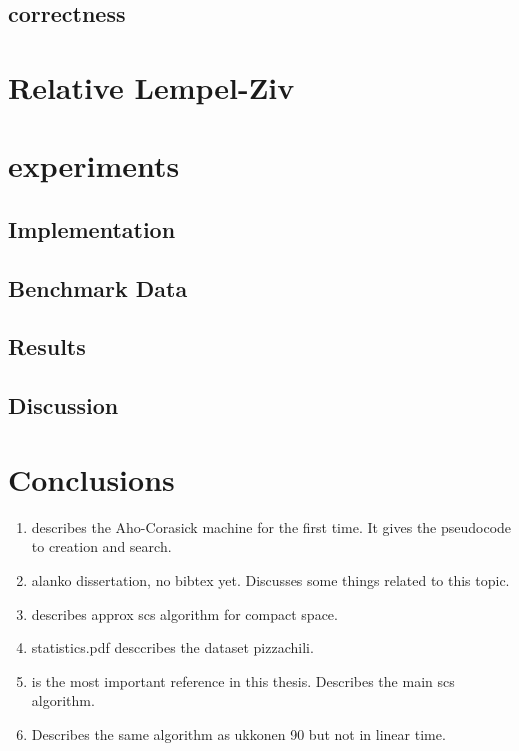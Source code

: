 \documentclass[english,twoside,censored,csm,algorithms-track-2020]{HYthesisML}
\theoremstyle{plain}
\theoremstyle{definition}
\begin{document}
  \section{correctness}


\chapter{Relative Lempel-Ziv}



\chapter{experiments}

  \section{Implementation}

  \section{Benchmark Data}

  \section{Results}

  \section{Discussion}

%
\chapter{Conclusions}
  

  \begin{enumerate}
  \item \citep{Aho75} describes the Aho-Corasick machine for the first time. It gives the pseudocode to creation and search.
  \item alanko dissertation, no bibtex yet. Discusses some things related to this topic.
  \item \citep{Alanko17} describes approx scs algorithm for compact space.
  \item statistics.pdf desccribes the dataset pizzachili.
  \item \citep{Ukkonen90} is the most important reference in this thesis. Describes the main scs algorithm.
  \item \citep{Tarhio88} Describes the same algorithm as ukkonen 90 but not in linear time.
  \end{enumerate}
\end{document}
